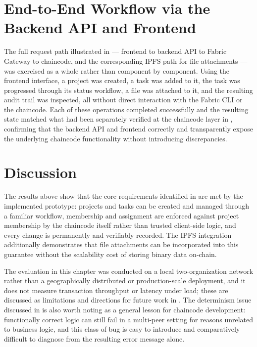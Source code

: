 \section{End-to-End Workflow via the Backend API and Frontend}
\label{sec:results-e2e}

The full request path illustrated in  — frontend to backend API to Fabric Gateway to chaincode, and the corresponding IPFS path for file attachments — was exercised as a whole rather than component by component. Using the frontend interface, a project was created, a task was added to it, the task was progressed through its status workflow, a file was attached to it, and the resulting audit trail was inspected, all without direct interaction with the Fabric CLI or the chaincode. Each of these operations completed successfully and the resulting state matched what had been separately verified at the chaincode layer in , confirming that the backend API and frontend correctly and transparently expose the underlying chaincode functionality without introducing discrepancies.

\section{Discussion}
\label{sec:results-discussion}

The results above show that the core requirements identified in  are met by the implemented prototype: projects and tasks can be created and managed through a familiar workflow, membership and assignment are enforced against project membership by the chaincode itself rather than trusted client-side logic, and every change is permanently and verifiably recorded. The IPFS integration additionally demonstrates that file attachments can be incorporated into this guarantee without the scalability cost of storing binary data on-chain.

The evaluation in this chapter was conducted on a local two-organization network rather than a geographically distributed or production-scale deployment, and it does not measure transaction throughput or latency under load; these are discussed as limitations and directions for future work in . The determinism issue discussed in  is also worth noting as a general lesson for chaincode development: functionally correct logic can still fail in a multi-peer setting for reasons unrelated to business logic, and this class of bug is easy to introduce and comparatively difficult to diagnose from the resulting error message alone.
